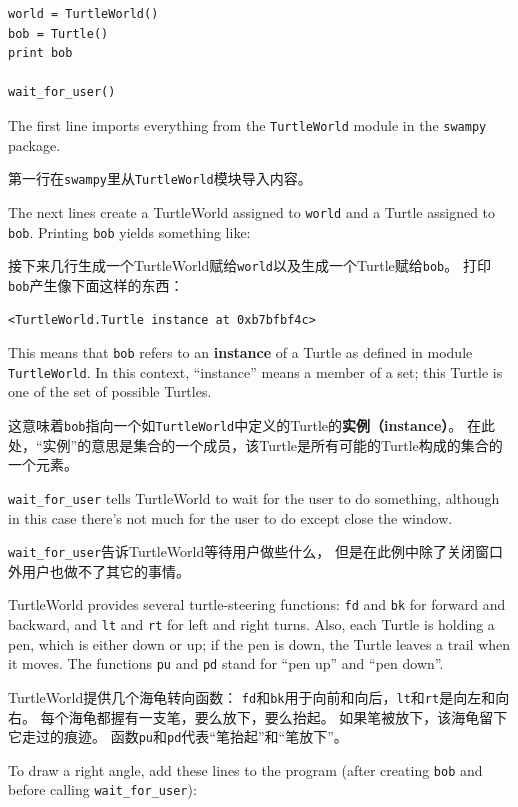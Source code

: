 \documentclass[10pt]{book}
\begin{document}
\begin{CJK}{UTF8}{gbsn}
\begin{verbatim}
world = TurtleWorld()
bob = Turtle()
print bob

wait_for_user()
\end{verbatim}
%
The first line imports everything from the {\tt TurtleWorld} module
in the {\tt swampy} package.

第一行在{\tt swampy}里从{\tt TurtleWorld}模块导入内容。

The next lines create a TurtleWorld assigned to {\tt world} and
a Turtle assigned to {\tt bob}.  Printing {\tt bob} yields something
like:

接下来几行生成一个TurtleWorld赋给{\tt world}以及生成一个Turtle赋给{\tt bob}。
打印{\tt bob}产生像下面这样的东西：

\begin{verbatim}
<TurtleWorld.Turtle instance at 0xb7bfbf4c>
\end{verbatim}
%
This means that {\tt bob} refers to
an {\bf instance} of a Turtle
as defined in module {\tt TurtleWorld}.  In this context,
``instance'' means a member of a set;
this Turtle is one of the set of possible Turtles.

这意味着{\tt bob}指向一个如{\tt TurtleWorld}中定义的Turtle的{\bf 实例（instance）}。
在此处，``实例''的意思是集合的一个成员，该Turtle是所有可能的Turtle构成的集合的一个元素。

\verb"wait_for_user" tells TurtleWorld to wait for the user
to do something, although in this case there's not much for
the user to do except close the window.

\verb"wait_for_user"告诉TurtleWorld等待用户做些什么，
但是在此例中除了关闭窗口外用户也做不了其它的事情。

TurtleWorld provides several
turtle-steering functions: {\tt fd} and {\tt bk} for
forward and backward, and {\tt lt} and {\tt rt} for left and
right turns.  Also, each Turtle is holding a pen, which is
either down or up; if the pen is down, the Turtle leaves
a trail when it moves.  The functions {\tt pu} and {\tt pd}
stand for ``pen up'' and ``pen down''.

TurtleWorld提供几个海龟转向函数：
{\tt fd}和{\tt bk}用于向前和向后，{\tt lt}和{\tt rt}是向左和向右。
每个海龟都握有一支笔，要么放下，要么抬起。
如果笔被放下，该海龟留下它走过的痕迹。
函数{\tt pu}和{\tt pd}代表``笔抬起''和``笔放下''。

To draw a right angle, add these lines to the program
(after creating {\tt bob} and before calling \verb"wait_for_user"):


\end{CJK}
\end{document}
